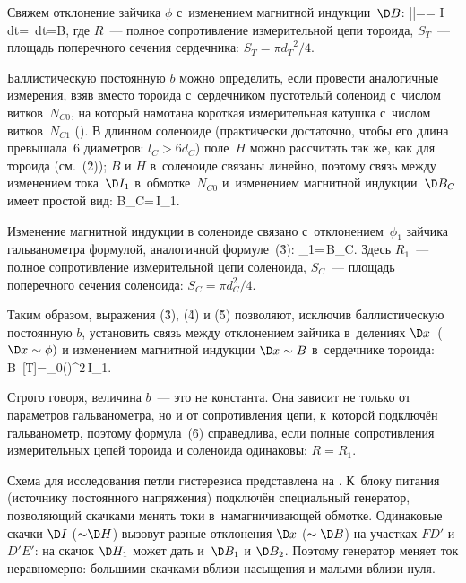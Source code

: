 Свяжем отклонение зайчика $\phi$ с~изменением магнитной индукции~$\D B$:
|\phi|==\int\! I\,dt= \int\! \E\,dt=\D B,
\ee
где $R$~--- полное сопротивление измерительной цепи тороида, $S_T$~--- площадь поперечного сечения сердечника: $S_T=\pi
{d_T}^2/4$.

Баллистическую постоянную $b$ можно определить, если провести аналогичные измерения, взяв вместо тороида с~сердечником
пустотелый соленоид с~числом витков~$N_{C0}$, на который намотана короткая измерительная катушка с~числом
витков~$N_{C1}$ (). В длинном соленоиде (практически достаточно, чтобы его длина превышала~6 диаметров: $l_C >
6d_C$) поле~$H$ можно рассчитать так же, как для тороида (см.~(\r{2})); $B$ и $H$ в~соленоиде связаны линейно, поэтому
связь между изменением тока~$\D I_1$ в~обмотке~$N_{C0}$ и~изменением магнитной индукции~$\D B_C$ имеет простой вид:
\D B_C=\,\D I_1.
\ee

Изменение магнитной индукции в соленоиде связано с~отклонением~$\phi_1$ зайчика гальванометра формулой, аналогичной
формуле~(\r{3}):
\phi_1=\,\D B_C.
\ee
Здесь $R_1$~--- полное сопротивление измерительной цепи соленоида, $S_C$~--- площадь поперечного сечения соленоида:
$S_C=\pi d^2_C/4$.

Таким образом, выражения (\r{3}), (\r{4}) и (\r{5}) позволяют, исключив баллистическую постоянную $b$, установить связь
между отклонением зайчика в~делениях $\D x$~($\D x\sim \phi)$ и изменением магнитной индукции $\D x\sim B$ в~сердечнике
тороида:
\D B~[Т]=\mu_0\left(\right)^2\,\D I_1.
\ee

Строго говоря, величина $b$~--- это не константа. Она зависит не только от параметров гальванометра, но и от
сопротивления цепи, к~которой подключён гальванометр, поэтому формула~(\r{6}) справедлива, если полные сопротивления
измерительных цепей тороида и соленоида одинаковы: $R = R_1$.

\eo Схема для исследования петли гистерезиса представлена на . К~блоку питания (источнику постоянного напряжения)
подключён специальный генератор, позволяющий скачками менять токи в~намагничивающей обмотке. Одинаковые скачки $\D I$
(${\sim}\D H$) вызовут разные отклонения $\D x$ ($\sim \D B$) на участках $FD'$ и $D'E'$: на  скачок $\D H_1$ может
дать и~$\D B_1$ и $\D B_2$. Поэтому генератор меняет ток неравномерно: большими скачками вблизи насыщения и малыми
вблизи нуля.

